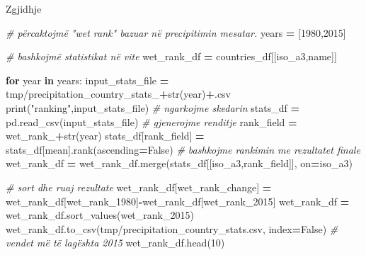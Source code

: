 \documentclass[
  ignorenonframetext,
]{beamer}
\newenvironment{Shaded}{\begin{snugshade}}{\end{snugshade}}
\newcommand{\BuiltInTok}[1]{#1}
\newcommand{\CommentTok}[1]{\textcolor[rgb]{0.56,0.35,0.01}{\textit{#1}}}
\newcommand{\ControlFlowTok}[1]{\textcolor[rgb]{0.13,0.29,0.53}{\textbf{#1}}}
\newcommand{\DecValTok}[1]{\textcolor[rgb]{0.00,0.00,0.81}{#1}}
\newcommand{\KeywordTok}[1]{\textcolor[rgb]{0.13,0.29,0.53}{\textbf{#1}}}
\newcommand{\NormalTok}[1]{#1}
\newcommand{\OperatorTok}[1]{\textcolor[rgb]{0.81,0.36,0.00}{\textbf{#1}}}
\newcommand{\StringTok}[1]{\textcolor[rgb]{0.31,0.60,0.02}{#1}}
\newcommand{\VariableTok}[1]{\textcolor[rgb]{0.00,0.00,0.00}{#1}}
\begin{document}
\begin{frame}[fragile]{Zgjidhje}
\protect\hypertarget{zgjidhje-10}{}

\begin{Shaded}
\begin{Highlighting}[]
\CommentTok{\# përcaktojmë "wet rank" bazuar në precipitimin mesatar.}
\NormalTok{years }\OperatorTok{=}\NormalTok{ [}\DecValTok{1980}\NormalTok{,}\DecValTok{2015}\NormalTok{]}

\CommentTok{\# bashkojmë statistikat në vite}
\NormalTok{wet\_rank\_df }\OperatorTok{=}\NormalTok{ countries\_df[[}\StringTok{\textquotesingle{}iso\_a3\textquotesingle{}}\NormalTok{,}\StringTok{\textquotesingle{}name\textquotesingle{}}\NormalTok{]]}

\ControlFlowTok{for}\NormalTok{ year }\KeywordTok{in}\NormalTok{ years:}
\NormalTok{    input\_stats\_file }\OperatorTok{=} \StringTok{\textquotesingle{}tmp/precipitation\_country\_stats\_\textquotesingle{}}\OperatorTok{+}\BuiltInTok{str}\NormalTok{(year)}\OperatorTok{+}\StringTok{\textquotesingle{}.csv\textquotesingle{}}
    \BuiltInTok{print}\NormalTok{(}\StringTok{"ranking"}\NormalTok{,input\_stats\_file)}
    \CommentTok{\# ngarkojme skedarin}
\NormalTok{    stats\_df }\OperatorTok{=}\NormalTok{ pd.read\_csv(input\_stats\_file)}
    \CommentTok{\# gjenerojme renditje}
\NormalTok{    rank\_field }\OperatorTok{=} \StringTok{\textquotesingle{}wet\_rank\_\textquotesingle{}}\OperatorTok{+}\BuiltInTok{str}\NormalTok{(year)}
\NormalTok{    stats\_df[rank\_field] }\OperatorTok{=}\NormalTok{ stats\_df[}\StringTok{\textquotesingle{}mean\textquotesingle{}}\NormalTok{].rank(ascending}\OperatorTok{=}\VariableTok{False}\NormalTok{)}
    \CommentTok{\# bashkojme rankimin me rezultatet finale}
\NormalTok{    wet\_rank\_df }\OperatorTok{=}\NormalTok{ wet\_rank\_df.merge(stats\_df[[}\StringTok{\textquotesingle{}iso\_a3\textquotesingle{}}\NormalTok{,rank\_field]], }
\NormalTok{                                    on}\OperatorTok{=}\StringTok{\textquotesingle{}iso\_a3\textquotesingle{}}\NormalTok{)}

\CommentTok{\# sort dhe ruaj rezultate}
\NormalTok{wet\_rank\_df[}\StringTok{\textquotesingle{}wet\_rank\_change\textquotesingle{}}\NormalTok{] }\OperatorTok{=}\NormalTok{ wet\_rank\_df[}\StringTok{\textquotesingle{}wet\_rank\_1980\textquotesingle{}}\NormalTok{]}\OperatorTok{{-}}\NormalTok{wet\_rank\_df[}\StringTok{\textquotesingle{}wet\_rank\_2015\textquotesingle{}}\NormalTok{]}
\NormalTok{wet\_rank\_df }\OperatorTok{=}\NormalTok{ wet\_rank\_df.sort\_values(}\StringTok{\textquotesingle{}wet\_rank\_2015\textquotesingle{}}\NormalTok{)}
\NormalTok{wet\_rank\_df.to\_csv(}\StringTok{\textquotesingle{}tmp/precipitation\_country\_stats.csv\textquotesingle{}}\NormalTok{, index}\OperatorTok{=}\VariableTok{False}\NormalTok{)}
\CommentTok{\# vendet më të lagështa 2015}
\NormalTok{wet\_rank\_df.head(}\DecValTok{10}\NormalTok{)}
\end{Highlighting}
\end{Shaded}
\end{frame}
\end{document}
